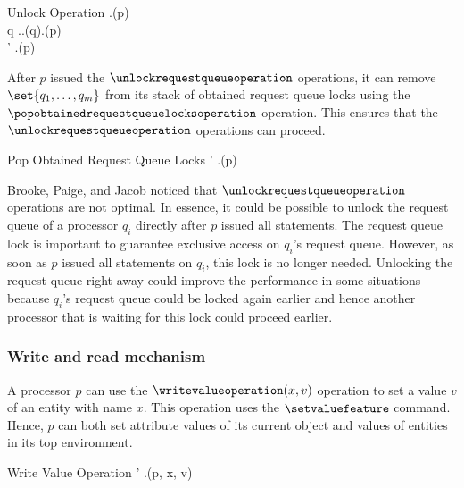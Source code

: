 \singlelineinferencerule
	{Unlock Operation}
	{
		\state.\isrequestqueuelockedfeature(p) \\
		\forall q \in \state.\processorsfeature \colon \neg \state.\requestqueuelocksfeature(q).\containsfeature(p) \\
		\state' \mathematicaldefinition \state.\unlockrequestqueuefeature(p)
	}
	{}
	{}
 
After $p$ issued the $\unlockrequestqueueoperation$ operations, it can remove $\set{q_{1}, \ldots, q_{m}}$ from its stack of obtained request queue locks using the $\popobtainedrequestqueuelocksoperation$ operation. This ensures that the $\unlockrequestqueueoperation$ operations can proceed.

\singlelineinferencerule
	{Pop Obtained Request Queue Locks}
	{
		\state' \mathematicaldefinition \state.\popobtainedrequestqueuelocksfeature(p)
	}
	{}
	{}
 
Brooke, Paige, and Jacob \cite{brooke-paige-jacob:2007:formal_semantics_for_SCOOP} noticed that $\unlockrequestqueueoperation$ operations are not optimal. In essence, it could be possible to unlock the request queue of a processor $q_{i}$ directly after $p$ issued all statements. The request queue lock is important to guarantee exclusive access on $q_{i}$'s request queue. However, as soon as $p$ issued all statements on $q_{i}$, this lock is no longer needed. Unlocking the request queue right away could improve the performance in some situations because $q_{i}$'s request queue could be locked again earlier and hence another processor that is waiting for this lock could proceed earlier.

\subsubsection{Write and read mechanism}
A processor $p$ can use the $\writevalueoperation(x, v)$ operation to set a value $v$ of an entity with name $x$. This operation uses the $\setvaluefeature$ command. Hence, $p$ can both set attribute values of its current object and values of entities in its top environment.

\singlelineinferencerule
	{Write Value Operation}
	{\state' \mathematicaldefinition \state.\setvaluefeature(p, x, v)}
	{}
	{}

